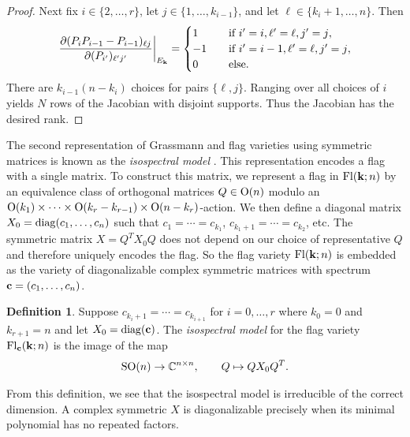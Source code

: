 \documentclass[12pt]{extarticle}
\theoremstyle{definition}
\newtheorem{definition}[theorem]{Definition}
\numberwithin{theorem}{section}
\newcommand{\CC}{\mathbb{C}}
\begin{document}
\begin{proof}
    Next fix $i \in \{2, \ldots, r\}$, let $j \in \{1, \ldots, k_{i-1}\}$, and let $\ell \in \{k_{i}+1, \ldots, n\}$.
    Then 
    \begin{align*}
        \left. \frac{\partial (P_{i}P_{i-1} - P_{i-1})_{\ell j}}{\partial (P_{i'}
)_{\ell'j'}}\right|_{E_{\bf k}} = 
        \begin{cases}
            1 &\quad \text{if $i' = i, \ell' = \ell, j' = j$},\\
            -1 &\quad \text{if $i' = i-1, \ell' = \ell, j' = j$},\\
            0 &\quad \text{else.}
        \end{cases}
    \end{align*}
    There are $k_{i-1}(n - k_i)$ choices for pairs $\{\ell, j\}$.
    Ranging over all choices of $i$ yields $N$ rows of the Jacobian with disjoint supports. 
    Thus the Jacobian has the desired rank.
\end{proof}
The second representation of Grassmann and flag varieties using symmetric matrices is known as the \emph{isospectral model} \cite{LY24b}. 
This representation encodes a flag with a single matrix.
To construct this matrix, we represent a flag in ${\rm Fl}({\bf k}; n)$ by an equivalence class of orthogonal matrices $Q \in {\rm O}(n)$ modulo an ${\rm O}(k_1) \times \cdots \times {\rm O}(k_r - k_{r-1}) \times {\rm O}(n-k_r)$-action. 
We then define a diagonal matrix $X_0 = {\rm diag}(c_1, \ldots, c_n)$ such that $c_1 = \cdots = c_{k_1}$, $c_{k_1+1} = \cdots = c_{k_2}$, etc. 
The symmetric matrix $X = Q^TX_0Q$ does not depend on our choice of representative $Q$ and therefore uniquely encodes the flag. 
So the flag variety ${\rm Fl}({\bf k}; n)$ is embedded as the variety of diagonalizable complex symmetric matrices with spectrum ${\bf c} = (c_1, \ldots, c_n)$. 
\begin{definition}
    Suppose $c_{{k_i}+1}= \cdots = c_{k_{i+1}}$ for $i=0,\ldots,r$ 
    where $k_0 =0$ and $k_{r+1} =n$ and let $X_0 = {\rm diag}({\bf c})$.
    The \emph{isospectral model} for the flag variety ${\rm Fl}_{\bf c}({\bf k}; n)$ is the image of the map
    \begin{align}\label{eq:iso-param}
        {\rm SO}(n) \to \CC^{n \times n}, \quad\quad Q \mapsto QX_0Q^T.
    \end{align}
\end{definition}
From this definition, we see that the isospectral model is irreducible of the correct dimension. 
A complex symmetric $X$ is diagonalizable precisely when  its minimal polynomial has no repeated factors. 
\end{document}
